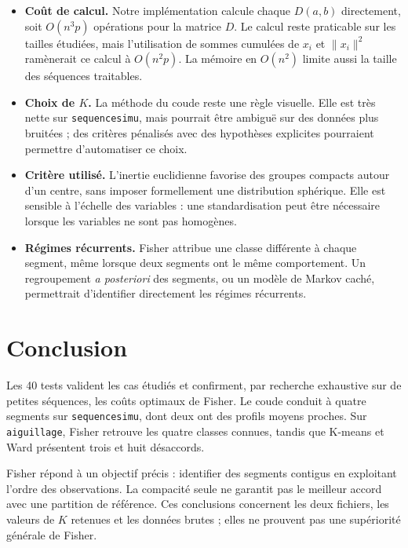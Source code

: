 \documentclass[10pt,a4paper]{article}
\begin{document}
\begin{itemize}
  \item \textbf{Coût de calcul.} Notre implémentation calcule chaque $D(a,b)$
        directement, soit $O(n^3p)$ opérations pour la matrice $D$. Le calcul reste
        praticable sur les tailles étudiées, mais l'utilisation de sommes cumulées de $x_i$ et
        $\lVert x_i\rVert^2$ ramènerait ce calcul à $O(n^2p)$. La mémoire en
        $O(n^2)$ limite aussi la taille des séquences traitables.
  \item \textbf{Choix de $K$.} La méthode du coude reste une règle visuelle. Elle
        est très nette sur \texttt{sequencesimu}, mais pourrait être ambiguë sur
        des données plus bruitées ; des critères pénalisés avec des hypothèses explicites
        pourraient permettre d'automatiser ce choix.
  \item \textbf{Critère utilisé.} L'inertie euclidienne favorise des groupes compacts autour d'un centre,
        sans imposer formellement une distribution sphérique. Elle est sensible à l'échelle des
        variables : une standardisation peut être nécessaire lorsque les variables
        ne sont pas homogènes.
  \item \textbf{Régimes récurrents.} Fisher attribue une classe différente à chaque
        segment, même lorsque deux segments ont le même comportement. Un
        regroupement \emph{a posteriori} des segments, ou un modèle de Markov caché,
        permettrait d'identifier directement les régimes récurrents.
\end{itemize}

\section{Conclusion}
Les 40 tests valident les cas étudiés et confirment, par recherche exhaustive sur
de petites séquences, les coûts optimaux de Fisher. Le coude conduit à quatre
segments sur \texttt{sequencesimu}, dont deux ont des profils moyens proches.
Sur \texttt{aiguillage}, Fisher retrouve les quatre classes connues, tandis que
K-means et Ward présentent trois et huit désaccords.

Fisher répond à un objectif précis : identifier des segments contigus en
exploitant l'ordre des observations. La compacité seule ne garantit pas le
meilleur accord avec une partition de référence. Ces conclusions concernent les
deux fichiers, les valeurs de $K$ retenues et les données brutes ; elles ne
prouvent pas une supériorité générale de Fisher.
\end{document}
